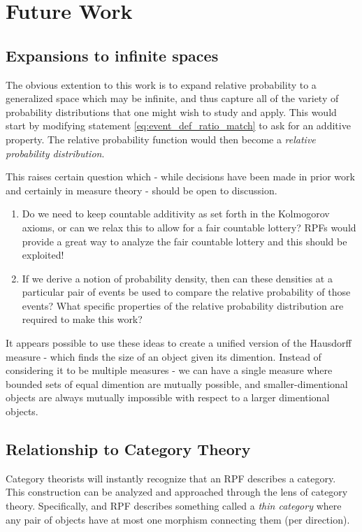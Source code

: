 \documentclass[twoside]{article}
\theoremstyle{plain}%
\theoremstyle{definition}
\theoremstyle{remark}
\begin{document}
\section{Future Work}
\subsection{Expansions to infinite spaces}
The obvious extention to this work is to expand relative probability to a generalized space which may be infinite, and thus capture all of the variety of probability distributions that one might wish to study and apply. This would start by modifying statement \ref{eq:event_def_ratio_match} to ask for an additive property. The relative probability function would then become a \textit{relative probability distribution}.

This raises certain question which - while decisions have been made in prior work and certainly in measure theory - should be open to discussion.
\begin{enumerate}
\item Do we need to keep countable additivity as set forth in the Kolmogorov axioms, or can we relax this to allow for a fair countable lottery? RPFs would provide a great way to analyze the fair countable lottery and this should be exploited!
\item If we derive a notion of probability density, then can these densities at a particular pair of events be used to compare the relative probability of those events? What specific properties of the relative probability distribution are required to make this work?
\end{enumerate}

It appears possible to use these ideas to create a unified version of the Hausdorff measure - which finds the size of an object given its dimention. Instead of considering it to be multiple measures - we can have a single measure where bounded sets of equal dimention are mutually possible, and smaller-dimentional objects are always mutually impossible with respect to a larger dimentional objects.

\subsection{Relationship to Category Theory}

Category theorists will instantly recognize that an RPF describes a category. This construction can be analyzed and approached through the lens of category theory. Specifically, and RPF describes something called a \textit{thin category} where any pair of objects have at most one morphism connecting them (per direction).
\end{document}
